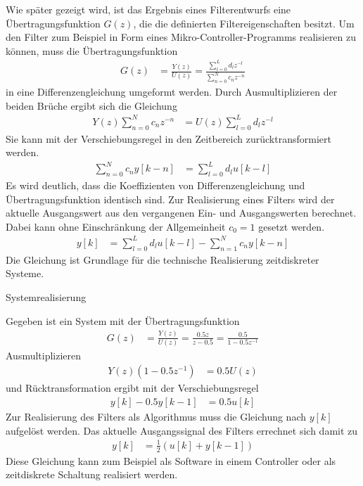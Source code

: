 Wie später gezeigt wird, ist das Ergebnis eines Filterentwurfs eine Übertragungsfunktion \(G(z)\), die die definierten Filtereigenschaften besitzt. Um den Filter zum Beispiel in Form eines Mikro-Controller-Programms realisieren zu können, muss die Übertragungsfunktion
\begin{align}
G(z) &= \frac{Y(z)}{U(z)} = \frac{\sum\limits_{l = 0}^{L}{d_{l}  z^{- l}}}{\sum\limits_{n = 0}^{N}{c_{n}  z^{- n}}} \label{eq:6.25}
\end{align}
in eine Differenzengleichung umgeformt werden. Durch Ausmultiplizieren der beiden Brüche ergibt sich die Gleichung
\begin{align}
Y(z)  \sum\limits_{n = 0}^{N}{c_{n}  z^{- n}} &= U(z)  \sum\limits_{l = 0}^{L}{d_{l}  z^{- l}} \label{eq:6.26}
\end{align}
Sie kann mit der Verschiebungsregel in den Zeitbereich zurücktransformiert werden.
\begin{align}
\sum\limits_{n = 0}^{N}{c_{n}  y[ k - n]} &= \sum\limits_{l = 0}^{L}{d_{l}  u[ k - l]} \label{eq:6.27}
\end{align}
Es wird deutlich, dass die Koeffizienten von Differenzengleichung und Übertragungsfunktion identisch sind. Zur Realisierung eines Filters wird der aktuelle Ausgangswert aus den vergangenen Ein- und Ausgangswerten berechnet. Dabei kann ohne Einschränkung der Allgemeinheit \(c_{0} = 1\) gesetzt werden.
\begin{align}
y[ k] &= \sum\limits_{l = 0}^{L}{d_{l}  u[ k - l]} - \sum\limits_{n = 1}^{N}{c_{n}  y[ k - n]} \label{eq:6.28}
\end{align}
Die Gleichung ist Grundlage für die technische Realisierung zeitdiskreter Systeme.

\begin{example}{Systemrealisierung}
\label{example:beispiel-systemrealisierung}

Gegeben ist ein System mit der Übertragungsfunktion
\begin{align*}
G(z) &= \frac{Y(z)}{U(z)} = \frac{0.5  z}{z - 0.5} = \frac{0.5}{1 - 0.5  z^{- 1}} 
\end{align*}
Ausmultiplizieren
\begin{align*}
Y(z)  \left( 1 - 0.5  z^{- 1} \right) &= 0.5  U(z) 
\end{align*}
und Rücktransformation ergibt mit der Verschiebungsregel
\begin{align*}
y[ k] - 0.5  y[ k - 1] &= 0.5  u[ k] 
\end{align*}
Zur Realisierung des Filters als Algorithmus muss die Gleichung nach \(y[k]\) aufgelöst werden. Das aktuelle Ausgangssignal des Filters errechnet sich damit zu
\begin{align*}
y[ k] &= \frac{1}{2}  \left( u[ k] + y[ k - 1] \right) 
\end{align*}
Diese Gleichung kann zum Beispiel als Software in einem Controller oder als zeitdiskrete Schaltung realisiert werden.

\end{example}

